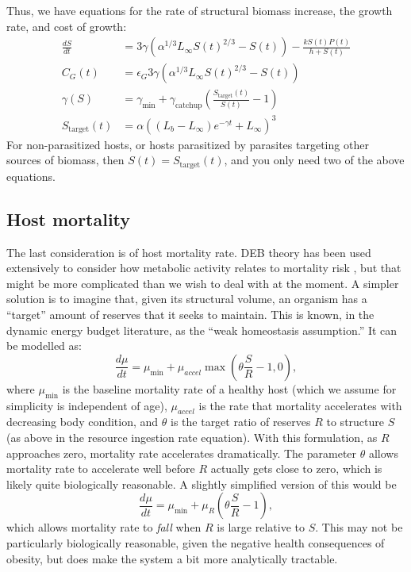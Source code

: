 \documentclass[11pt,reqno,final,pdftex]{amsart}\usepackage[]{graphicx}\usepackage[]{color}
\theoremstyle{plain}
\numberwithin{equation}{part}
\begin{document}
Thus, we have equations for the rate of structural biomass increase, the growth rate, and cost of growth:
\begin{align}
\frac{dS}{dt} &= 3\gamma  \left(\alpha^{1/3}L_{\infty }S(t)^{2/3}-S(t)\right)-\frac{k S(t) P(t)}{h+S(t)} \\
C_G(t)&=\epsilon_G 3\gamma \left(\alpha^{1/3}L_{\infty }S(t)^{2/3}-S(t)\right) \\
\gamma(S) &=\gamma_{\min}+\gamma_{\text{catchup}}\left(\frac{S_{\text{target}}(t)}{S(t)}-1\right) \\
S_{\text{target}}(t) &=\alpha \left(\left(L_b-L_{\infty }\right) e^{-\gamma  t}+L_{\infty }\right)^3
\end{align}
For non-parasitized hosts, or hosts parasitized by parasites targeting other sources of biomass, then $S(t)=S_{\text{target}}(t)$, and you only need two of the above equations.

\subsection*{Host mortality}
The last consideration is of host mortality rate.
DEB theory has been used extensively to consider how metabolic activity relates to mortality risk \citep[by keeping track of things like oxidative damage, e.g.,][]{vanLeeuwen2002,Kooijman2009}, but that might be more complicated than we wish to deal with at the moment.
A simpler solution is to imagine that, given its structural volume, an organism has a ``target'' amount of reserves that it seeks to maintain.
This is known, in the dynamic energy budget literature, as the ``weak homeostasis assumption.''
It can be modelled as:
\begin{equation}
\frac{d\mu}{dt} = \mu_{\min} + \mu_{accel}\max\left(\theta \frac{S}{R} - 1, 0\right),
\end{equation}
where $\mu_{\min}$ is the baseline mortality rate of a healthy host (which we assume for simplicity is independent of age), $\mu_{accel}$ is the rate that mortality accelerates with decreasing body condition, and $\theta$ is the target ratio of reserves $R$ to structure $S$ (as above in the resource ingestion rate equation).
With this formulation, as $R$ approaches zero, mortality rate accelerates dramatically.
The parameter $\theta$ allows mortality rate to accelerate well before $R$ actually gets close to zero, which is likely quite biologically reasonable.
A slightly simplified version of this would be
\begin{equation}
\frac{d\mu}{dt} = \mu_{\min} + \mu_{R}\left(\theta \frac{S}{R} - 1\right),
\end{equation}
which allows mortality rate to \emph{fall} when $R$ is large relative to $S$.
This may not be particularly biologically reasonable, given the negative health consequences of obesity, but does make the system a bit more analytically tractable.
\end{document}
